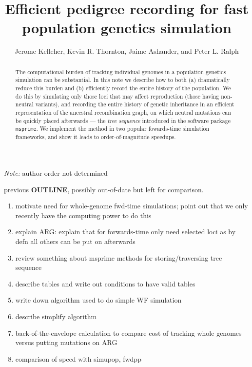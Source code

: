 \documentclass{article}
\newcommand{\msprime}{\texttt{msprime}}
\begin{document}
\title{Efficient pedigree recording for fast population genetics simulation}
\author{Jerome Kelleher,
        Kevin R. Thornton,
        Jaime Ashander, and
        Peter L. Ralph}
\maketitle

\emph{Note:} author order not determined


\begin{abstract}
    The computational burden of tracking individual genomes
    in a population genetics simulation can be substantial.
    In this note we describe how to both (a) dramatically reduce this burden and
    (b) efficiently record the entire history of the population.
    We do this by simulating only those loci that may affect reproduction (those having non-neutral variants),
    and recording the entire history of genetic inheritance in an efficient representation of the ancestral recombination graph,
    on which neutral mutations can be quickly placed afterwards ---
    the \emph{tree sequence} introduced in the software package \msprime.
    We implement the method in two popular fowards-time simulation frameworks,
    and show it leads to order-of-magnitude speedups.
\end{abstract}


previous \textbf{OUTLINE}, possibly out-of-date but left for comparison.
\begin{enumerate}
    \item motivate need for whole-genome fwd-time simulations; point out that we only recently have the computing power to do this
    \item explain ARG: explain that for forwards-time only need selected loci as by defn all others can be put on afterwards
    \item review something about msprime methods for storing/traversing tree sequence
    \item describe tables and write out conditions to have valid tables
    \item write down algorithm used to do simple WF simulation
    \item describe simplify algorithm
    \item back-of-the-envelope calculation to compare cost of tracking whole genomes versus putting mutations on ARG
    \item comparison of speed with simupop, fwdpp
\end{enumerate}
\end{document}
